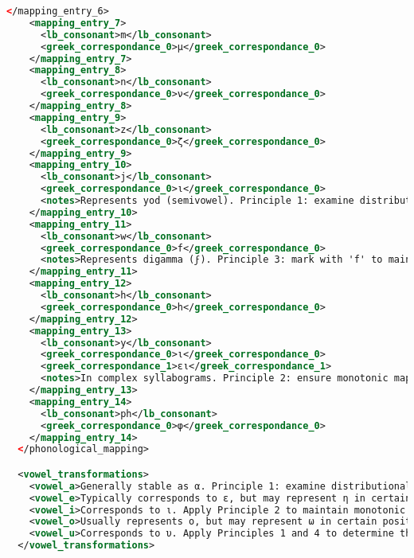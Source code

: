 \begin{lstlisting}[style=mystyle, language=XML, breaklines=true]
    </mapping_entry_6>
    <mapping_entry_7>
      <lb_consonant>m</lb_consonant>
      <greek_correspondance_0>μ</greek_correspondance_0>
    </mapping_entry_7>
    <mapping_entry_8>
      <lb_consonant>n</lb_consonant>
      <greek_correspondance_0>ν</greek_correspondance_0>
    </mapping_entry_8>
    <mapping_entry_9>
      <lb_consonant>z</lb_consonant>
      <greek_correspondance_0>ζ</greek_correspondance_0>
    </mapping_entry_9>
    <mapping_entry_10>
      <lb_consonant>j</lb_consonant>
      <greek_correspondance_0>ι</greek_correspondance_0>
      <notes>Represents yod (semivowel). Principle 1: examine distributional patterns to determine its most likely Greek reflex.</notes>
    </mapping_entry_10>
    <mapping_entry_11>
      <lb_consonant>w</lb_consonant>
      <greek_correspondance_0>f</greek_correspondance_0>
      <notes>Represents digamma (ϝ). Principle 3: mark with 'f' to maintain structural sparsity in the mapping.</notes>
    </mapping_entry_11>
    <mapping_entry_12>
      <lb_consonant>h</lb_consonant>
      <greek_correspondance_0>h</greek_correspondance_0>
    </mapping_entry_12>
    <mapping_entry_13>
      <lb_consonant>y</lb_consonant>
      <greek_correspondance_0>ι</greek_correspondance_0>
      <greek_correspondance_1>ει</greek_correspondance_1>
      <notes>In complex syllabograms. Principle 2: ensure monotonic mapping when resolving to ι or ει.</notes>
    </mapping_entry_13>
    <mapping_entry_14>
      <lb_consonant>ph</lb_consonant>
      <greek_correspondance_0>φ</greek_correspondance_0>
    </mapping_entry_14>
  </phonological_mapping>

  <vowel_transformations>
    <vowel_a>Generally stable as α. Principle 1: examine distributional context for potential contractions.</vowel_a>
    <vowel_e>Typically corresponds to ε, but may represent η in certain positions. Apply Principle 4 based on documented patterns.</vowel_e>
    <vowel_i>Corresponds to ι. Apply Principle 2 to maintain monotonic mapping with any adjacent vowels.</vowel_i>
    <vowel_o>Usually represents ο, but may represent ω in certain positions, especially at the end of the words in verbs. Apply Principle 3 for sparsity in mapping.</vowel_o>
    <vowel_u>Corresponds to υ. Apply Principles 1 and 4 to determine the most likely correspondence.</vowel_u>
  </vowel_transformations>


\end{lstlisting}
